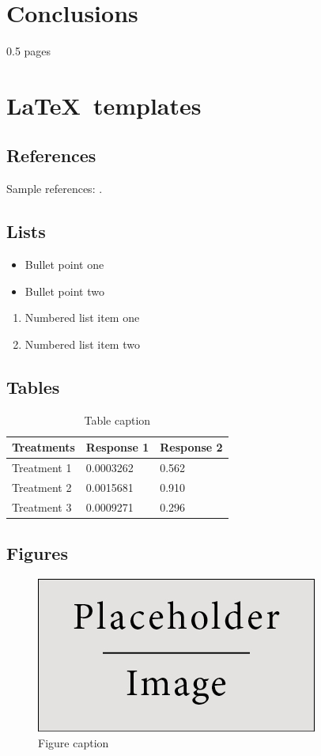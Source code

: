 \documentclass[review]{elsarticle}
\begin{document}
\section{Conclusions}
0.5 pages

\section{\LaTeX\ templates}

\subsection{References}
Sample references: \cite{Shao2014, Chidiac20115037}.

\subsection{Lists}
\begin{itemize}
\item Bullet point one
\item Bullet point two
\end{itemize}

\begin{enumerate}
\item Numbered list item one
\item Numbered list item two
\end{enumerate}

\subsection{Tables}
\begin{table}[h]
\centering
\begin{tabular}{l l l}
\hline
\textbf{Treatments} & \textbf{Response 1} & \textbf{Response 2}\\
\hline
Treatment 1 & 0.0003262 & 0.562 \\
Treatment 2 & 0.0015681 & 0.910 \\
Treatment 3 & 0.0009271 & 0.296 \\
\hline
\end{tabular}
\caption{Table caption}
\end{table}

\subsection{Figures}
\begin{figure}[h]
\centering\includegraphics[width=0.4\linewidth]{placeholder}
\caption{Figure caption}
\end{figure}
\end{document}
